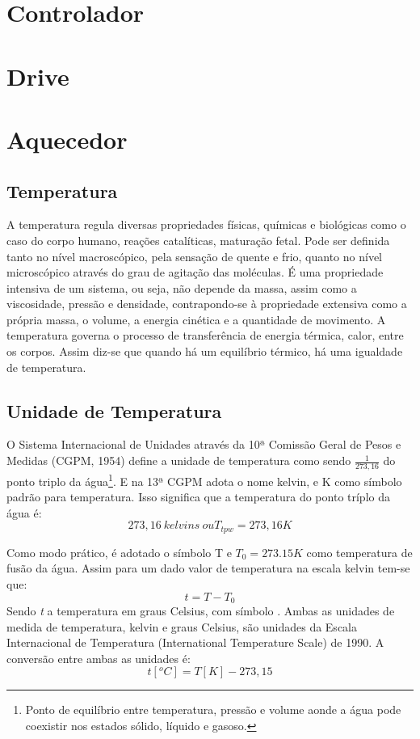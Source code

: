 \section{Controlador}
\section{Drive}
\section{Aquecedor}
\subsection{ Temperatura }
A temperatura regula diversas propriedades físicas, químicas e biológicas como o caso do corpo humano, reações catalíticas, maturação fetal. Pode ser definida tanto no nível macroscópico, pela sensação de quente e frio, quanto no nível microscópico através do grau de agitação das moléculas. É uma propriedade intensiva de um sistema, ou seja, não depende da massa, assim como a viscosidade, pressão e densidade, contrapondo-se à propriedade extensiva como a própria massa, o volume, a energia cinética e a quantidade de movimento.
A temperatura governa o processo de transferência de energia térmica, calor, entre os corpos. Assim diz-se que quando há um equilíbrio térmico, há uma igualdade de temperatura.

\subsection{ Unidade de Temperatura }
O Sistema Internacional de Unidades através da 10ª Comissão Geral de Pesos e Medidas (CGPM, 1954) define a unidade de temperatura como sendo $\frac{1}{273,16} $  do ponto triplo da água\footnote{Ponto de equilíbrio entre temperatura, pressão e volume aonde a água pode coexistir nos estados sólido, líquido e gasoso.}. E na 13ª CGPM adota o nome kelvin, e K como símbolo padrão para temperatura.
Isso significa que a temperatura do ponto tríplo da água é:
\[ 273,16 \ kelvins \   ou T_{tpw} = 273,16 K \]

Como modo prático, é adotado o símbolo T e $ T_0 = 273.15K $ como temperatura de fusão da água. Assim para um dado valor de temperatura na escala kelvin tem-se que:
\[t = T - T_0\]
Sendo \emph{t} a temperatura em graus Celsius, com símbolo \textcelsius. Ambas as unidades de medida de temperatura, kelvin e graus Celsius, são unidades da Escala Internacional de Temperatura (International Temperature Scale) de 1990.
A conversão entre ambas as unidades é:
\[ t[ ^o C ] = T[K] - 273,15 \]

